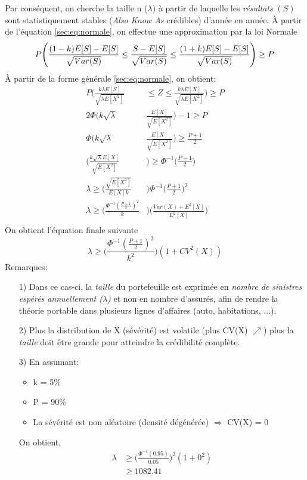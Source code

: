 \documentclass[11pt,french]{report}
\begin{document}
Par conséquent, on cherche la taille n ($\lambda$) à partir de laquelle les \textit{résultats} $(S)$ sont statistiquement stables (\textit{Also Know As} crédibles) d'année en année. À partir de l'équation \ref{sec:eq:normale}, on effectue une approximation par la loi Normale
\begin{equation}
P\Bigg( \frac{(1 - k)E[S] - E[S]}{\sqrt{Var(S)}} \leq \frac{S - E[S]}{\sqrt{Var(S)}} \leq \frac{(1 + k)E[S] - E[S]}{\sqrt{Var(S)}}\Bigg) \geq P \\
\end{equation}
À partir de la forme générale \ref{sec:eq:normale}, on obtient:
\begin{align*}
P\Bigg( \frac{ k \lambda E[S]}{\sqrt{\lambda E[X^2]}} &\leq Z \leq \frac{k \lambda E[X]}{\sqrt{\lambda E[X^2]}}\Bigg) \geq P \\
2 \Phi\Bigg(k \sqrt{\lambda} &\frac{E[X]}{\sqrt{E[X^2]}}\Bigg) -1 \geq P \\
\Phi \Bigg( k \sqrt{\lambda}& \frac{E[X]}{\sqrt{E[X^2]}}\Bigg) \geq \frac{P + 1}{2}\\
\Bigg(\frac{k \sqrt{\lambda} E[X]}{\sqrt{E[X^2]}} &\Bigg) \geq \Phi^{-1}\Bigg(\frac{P + 1}{2}\Bigg)\\
\lambda \geq  \Bigg(\frac{\sqrt{E[X^2]}}{E[X] k } &\Bigg) \Phi^{-1}\Bigg(\frac{P + 1}{2}\Bigg)^2\\
\lambda  \geq \Bigg(\frac{\Phi^{-1}(\frac{P + 1}{2})^2}{k}& \Bigg) \Bigg(\frac{Var(X) + E^2[X]}{E^2[X]}\Bigg)\\
\end{align*}
On obtient l'équation finale suivante 
\begin{equation}
\lambda  \geq \Bigg(\frac{\Phi^{-1}(\frac{P + 1}{2})^2}{k^2} \Bigg) (1 + CV^2(X))
\end{equation}
Remarques:
\begin{itemize}
\item[1)]Dans ce cas-ci, la \textit{taille} du portefeuille est exprimée en \textit{nombre de sinistres espérés annuellement ($\lambda$)} et non en nombre d'assurés, afin de rendre la théorie portable dans plusieurs lignes d'affaires (auto, habitations, ...).
\item[2)]Plus la distribution de X (sévérité) est volatile (plus CV(X) $\nearrow$) plus la \textit{taille} doit être grande pour atteindre la crédibilité complète.
\item[3)]En assumant:
		\begin{itemize}
		\item k = 5\%
		\item P = 90\%
		\item La sévérité est non aléatoire (densité dégénérée) $\Rightarrow$ CV(X) = 0
		\end{itemize}
		On obtient,
		\begin{align*}
		\lambda &\geq \Bigg(\frac{\Phi^{-1}(0.95)}{0.05}\Bigg)^{2} (1 + 0^2)\\
		&\geq 1082.41
		\end{align*}
\end{itemize}
\end{document}
